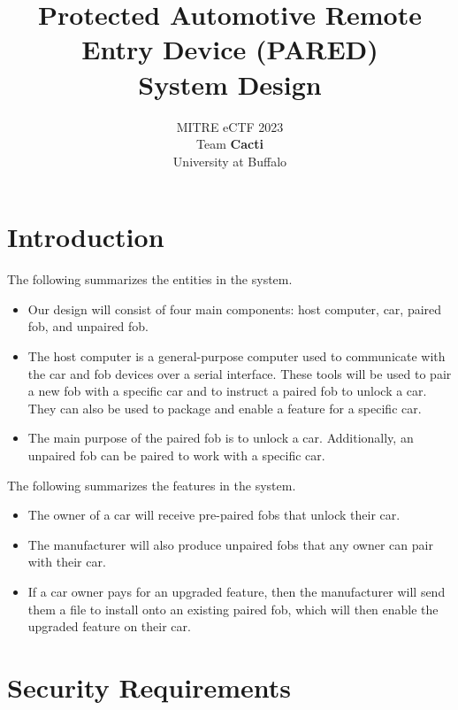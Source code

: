 \documentclass[11pt,oneside,onecolumn,letterpaper]{article}
\title{Protected Automotive Remote Entry Device (PARED) \\ System Design}
\author{MITRE eCTF 2023\\Team \textbf{Cacti}\\ University at Buffalo}
\date{}
\begin{document}
\normalsize


\maketitle

\renewcommand{\thepage}{System Design, Team Cacti, University at Buffalo--\arabic{page}}
\setcounter{page}{1} \normalsize
%

\newcommand{\flagRollback}{\textsf{Rollback}\xspace}

\section{Introduction}

The following summarizes the entities in the system.
\begin{itemize}
	\item Our design will consist of four main components: host computer, car, paired fob, and unpaired fob.
	\item The host computer is a general-purpose computer used to communicate with the car and fob devices over a serial interface. These tools will be used to pair a new fob with a specific car and to instruct a paired fob to unlock a car. They can also be used to package and enable a feature for a specific car.
	\item The main purpose of the paired fob is to unlock a car. Additionally, an unpaired fob can be paired to work with a specific car.
\end{itemize}

The following summarizes the features in the system.
\begin{itemize}
	\item The owner of a car will receive pre-paired fobs that unlock their car. 
	\item The manufacturer will also produce unpaired fobs that any owner can pair with their car.
	\item If a car owner pays for an upgraded feature, then the manufacturer will send them a file to install onto an existing paired fob, which will then enable the upgraded feature on their car.
\end{itemize}

\section{Security Requirements}
\end{document}

